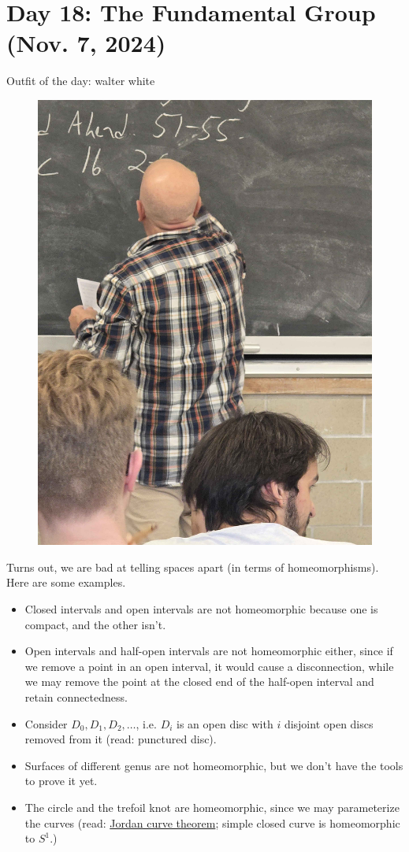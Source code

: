 \section{Day 18: The Fundamental Group (Nov. 7, 2024)}
Outfit of the day: walter white
\begin{figure}[h]
    \centering
    \includegraphics[scale=0.1]{MAT327 Notes/Dror Shirts/dror day 17 shirt.jpg}
\end{figure}

\noindent Turns out, we are bad at telling spaces apart (in terms of homeomorphisms). Here are some examples.
\begin{itemize}
    \item Closed intervals and open intervals are not homeomorphic because one is compact, and the other isn't.
    \item Open intervals and half-open intervals are not homeomorphic either, since if we remove a point in an open interval, it would cause a disconnection, while we may remove the point at the closed end of the half-open interval and retain connectedness.
    \item Consider $D_0, D_1, D_2, \dots$, i.e. $D_i$ is an open disc with $i$ disjoint open discs removed from it (read: punctured disc).
    \item Surfaces of different genus are not homeomorphic, but we don't have the tools to prove it yet.
    \item The circle and the trefoil knot are homeomorphic, since we may parameterize the curves (read: \href{https://en.wikipedia.org/wiki/Jordan_curve_theorem}{Jordan curve theorem}; simple closed curve is homeomorphic to $S^1$.)
\end{itemize}


